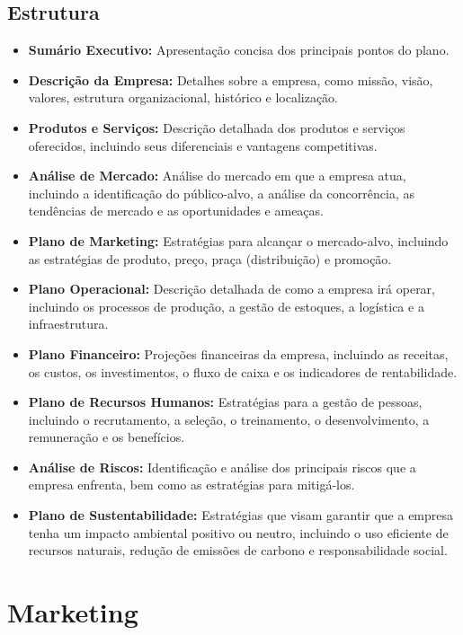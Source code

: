 \documentclass{article}
\begin{document}
\subsection{Estrutura}
\begin{itemize}
    \item \textbf{Sumário Executivo:} Apresentação concisa dos principais pontos do plano.
    \item \textbf{Descrição da Empresa:} Detalhes sobre a empresa, como missão, visão, valores, estrutura organizacional, histórico e localização.
    \item \textbf{Produtos e Serviços:} Descrição detalhada dos produtos e serviços oferecidos, incluindo seus diferenciais e vantagens competitivas.
    \item \textbf{Análise de Mercado:} Análise do mercado em que a empresa atua, incluindo a identificação do público-alvo, a análise da concorrência, as tendências de mercado e as oportunidades e ameaças.
    \item \textbf{Plano de Marketing:} Estratégias para alcançar o mercado-alvo, incluindo as estratégias de produto, preço, praça (distribuição) e promoção.
    \item \textbf{Plano Operacional:} Descrição detalhada de como a empresa irá operar, incluindo os processos de produção, a gestão de estoques, a logística e a infraestrutura.
    \item \textbf{Plano Financeiro:} Projeções financeiras da empresa, incluindo as receitas, os custos, os investimentos, o fluxo de caixa e os indicadores de rentabilidade.
    \item \textbf{Plano de Recursos Humanos:} Estratégias para a gestão de pessoas, incluindo o recrutamento, a seleção, o treinamento, o desenvolvimento, a remuneração e os benefícios.
    \item \textbf{Análise de Riscos:} Identificação e análise dos principais riscos que a empresa enfrenta, bem como as estratégias para mitigá-los.
    \item \textbf{Plano de Sustentabilidade:} Estratégias que visam garantir que a empresa tenha um impacto ambiental positivo ou neutro, incluindo o uso eficiente de recursos naturais, redução de emissões de carbono e responsabilidade social.
\end{itemize}

\section{Marketing}
\end{document}
